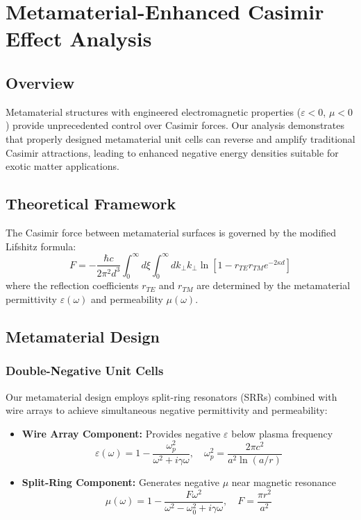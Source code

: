 \documentclass[11pt]{article}
\begin{document}
\section*{Metamaterial-Enhanced Casimir Effect Analysis}

\subsection*{Overview}
Metamaterial structures with engineered electromagnetic properties ($\varepsilon < 0$, $\mu < 0$) provide unprecedented control over Casimir forces. Our analysis demonstrates that properly designed metamaterial unit cells can reverse and amplify traditional Casimir attractions, leading to enhanced negative energy densities suitable for exotic matter applications.

\subsection*{Theoretical Framework}
The Casimir force between metamaterial surfaces is governed by the modified Lifshitz formula:
\[
  F = -\frac{\hbar c}{2\pi^2 d^3} \int_0^\infty d\xi \int_0^\infty dk_\perp k_\perp \ln\left[1 - r_{TE}r_{TM}e^{-2\kappa d}\right]
\]
where the reflection coefficients $r_{TE}$ and $r_{TM}$ are determined by the metamaterial permittivity $\varepsilon(\omega)$ and permeability $\mu(\omega)$.

\subsection*{Metamaterial Design}
\subsubsection*{Double-Negative Unit Cells}
Our metamaterial design employs split-ring resonators (SRRs) combined with wire arrays to achieve simultaneous negative permittivity and permeability:

\begin{itemize}
  \item \textbf{Wire Array Component:} Provides negative $\varepsilon$ below plasma frequency
    \[
      \varepsilon(\omega) = 1 - \frac{\omega_p^2}{\omega^2 + i\gamma\omega}, \quad \omega_p^2 = \frac{2\pi c^2}{a^2 \ln(a/r)}
    \]
  
  \item \textbf{Split-Ring Component:} Generates negative $\mu$ near magnetic resonance
    \[
      \mu(\omega) = 1 - \frac{F\omega^2}{\omega^2 - \omega_0^2 + i\gamma\omega}, \quad F = \frac{\pi r^2}{a^2}
    \]
\end{itemize}
\end{document}
